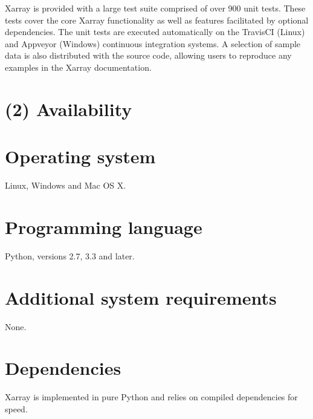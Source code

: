 \documentclass{jors}
\begin{document}

Xarray is provided with a large test suite comprised of over 900 unit tests.
These tests cover the core Xarray functionality as well as features facilitated by optional dependencies.
The unit tests are executed automatically on the TravisCI (Linux) \citep{TravisCI} and Appveyor (Windows) \citep{Appveyor} continuous integration systems.
A selection of sample data is also distributed with the source code, allowing users to reproduce any examples in the Xarray documentation.

\section*{(2) Availability}
\vspace{0.5cm}
\section*{Operating system}

Linux, Windows and Mac OS X.

\section*{Programming language}

Python, versions 2.7, 3.3 and later.

\section*{Additional system requirements}

None.

\section*{Dependencies}

Xarray is implemented in pure Python and relies on compiled dependencies for
speed.
\end{document}
